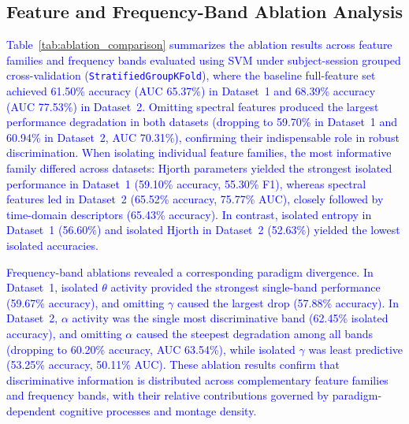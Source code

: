\documentclass[conference]{IEEEtran}
\begin{document}
\subsection{Feature and Frequency-Band Ablation Analysis}
\textcolor{blue}{Table~\ref{tab:ablation_comparison} summarizes the ablation results across feature families and frequency bands evaluated using SVM under subject-session grouped cross-validation (\texttt{StratifiedGroupKFold}), where the baseline full-feature set achieved 61.50\% accuracy (AUC 65.37\%) in Dataset~1 and 68.39\% accuracy (AUC 77.53\%) in Dataset~2. Omitting spectral features produced the largest performance degradation in both datasets (dropping to 59.70\% in Dataset~1 and 60.94\% in Dataset~2, AUC 70.31\%), confirming their indispensable role in robust discrimination. When isolating individual feature families, the most informative family differed across datasets: Hjorth parameters yielded the strongest isolated performance in Dataset~1 (59.10\% accuracy, 55.30\% F1), whereas spectral features led in Dataset~2 (65.52\% accuracy, 75.77\% AUC), closely followed by time-domain descriptors (65.43\% accuracy). In contrast, isolated entropy in Dataset~1 (56.60\%) and isolated Hjorth in Dataset~2 (52.63\%) yielded the lowest isolated accuracies.}

\textcolor{blue}{Frequency-band ablations revealed a corresponding paradigm divergence. In Dataset~1, isolated $\theta$ activity provided the strongest single-band performance (59.67\% accuracy), and omitting $\gamma$ caused the largest drop (57.88\% accuracy). In Dataset~2, $\alpha$ activity was the single most discriminative band (62.45\% isolated accuracy), and omitting $\alpha$ caused the steepest degradation among all bands (dropping to 60.20\% accuracy, AUC 63.54\%), while isolated $\gamma$ was least predictive (53.25\% accuracy, 50.11\% AUC). These ablation results confirm that discriminative information is distributed across complementary feature families and frequency bands, with their relative contributions governed by paradigm-dependent cognitive processes and montage density.}
\end{document}
